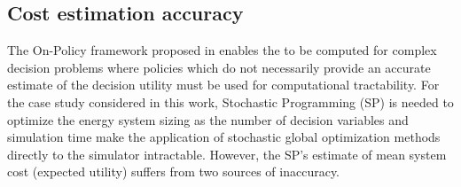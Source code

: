 \begin{subappendices}
    \subsection{Cost estimation accuracy} \label{app:districts-cost-accuracy}

    The On-Policy  framework proposed in  enables the  to be computed for complex decision problems where policies which do not necessarily provide an accurate estimate of the decision utility must be used for computational tractability. For the case study considered in this work, Stochastic Programming (SP) is needed to optimize the energy system sizing as the number of decision variables and simulation time make the application of stochastic global optimization methods directly to the simulator intractable. However, the SP's estimate of mean system cost (expected utility) suffers from two sources of inaccuracy.


\end{subappendices}
